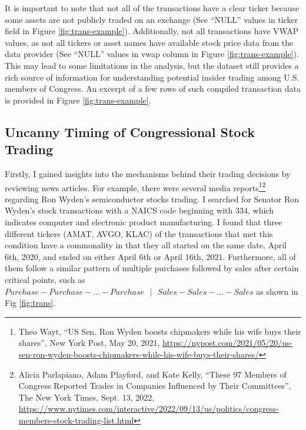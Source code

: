 \documentclass[15pt,letterpaper]{article}
\begin{document}
It is important to note that not all of the transactions have a clear ticker because some assets are not publicly traded on an exchange (See ``NULL'' values in ticker field in Figure \ref{fig:trans-example}). Additionally, not all transactions have VWAP values, as not all tickers or asset names have available stock price data from the data provider (See ``NULL'' values in vwap column in Figure \ref{fig:trans-example}). This may lead to some limitations in the analysis, but the dataset still provides a rich source of information for understanding potential insider trading among U.S. members of Congress. An excerpt of a few rows of such compiled transaction data is provided in Figure \ref{fig:trans-example}.

\subsection{Uncanny Timing of Congressional Stock Trading} \label{uct}

Firstly, I gained insights into the mechanisms behind their trading decisions by reviewing news articles. For example, there were several media reports\footnote{Theo Wayt, ``US Sen. Ron Wyden boosts chipmakers while his wife buys their shares'', New York Post, May 20, 2021, \url{https://nypost.com/2021/05/20/us-sen-ron-wyden-boosts-chipmakers-while-his-wife-buys-their-shares/}}\footnote{ Alicia Parlapiano, Adam Playford, and Kate Kelly, ``These 97 Members of Congress Reported Trades in Companies Influenced by Their Committees'', The New York Times, Sept. 13, 2022, \url{https://www.nytimes.com/interactive/2022/09/13/us/politics/congress-members-stock-trading-list.html}}
regarding Ron Wyden's semiconductor stocks trading.
I searched for Senator Ron Wyden's stock transactions with a NAICS code beginning with 334, which indicates computer and electronic product manufacturing.
I found that three different tickers (AMAT, AVGO, KLAC) of the transactions that met this condition have a commonality in that they all started on the same date, April 6th, 2020, and ended on either April 6th or April 16th, 2021. Furthermore, all of them follow a similar pattern of multiple purchases followed by sales after certain critical points, such as $Purchase-Purchase- \hdots - Purchase \text{ } |  \text { } Sales - Sales - \hdots - Sales$ as shown in Fig \ref{fig:trans}.
\end{document}
